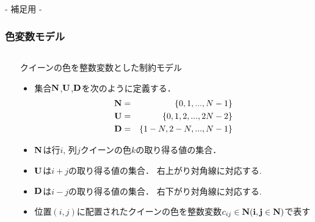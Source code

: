 

\appendix

\backupbegin



\begin{frame}
    \frametitle{~}
    \centering
    - 補足用 -
\end{frame}

\begin{frame}
    \frametitle{色変数モデル}
    \begin{columns}
        \begin{column}{0.3\textwidth}
    
        \end{column}
        \begin{column}{0.7\textwidth}
    {\scriptsize
        \alert{クイーンの色}を整数変数とした制約モデル\\
        \setlength{\abovedisplayskip}{1pt} %
        \setlength{\belowdisplayskip}{1pt} %
        \begin{block}{}
            \begin{itemize}
                \item 集合$\bf N$,$\bf U$,$\bf D$を次のように定義する．
                    \begin{eqnarray*}
                        \bf N &=& \{0,1,...,N-1\}\\
                        \bf U &=& \{0,1,2,...,2N-2\}\\
                        \bf D &=& \{1-N,2-N,...,N-1\}
                    \end{eqnarray*}
                \item $\bf N$は行$i$, 列$j$クイーンの色$k$の取り得る値の集合．\\
                \item $\bf U$は$i+j$の取り得る値の集合． 右上がり対角線に対応する.\\
                \item $\bf D$は$i-j$の取り得る値の集合． 右下がり対角線に対応する.\\
                \item 位置$(i, j)$に配置されたクイーンの色を整数変数$c_{ij} \in \bf N (i, j \in \bf N)$で表す

\end{itemize}
\end{block}}
\end{column}
\end{columns}
\end{frame}
